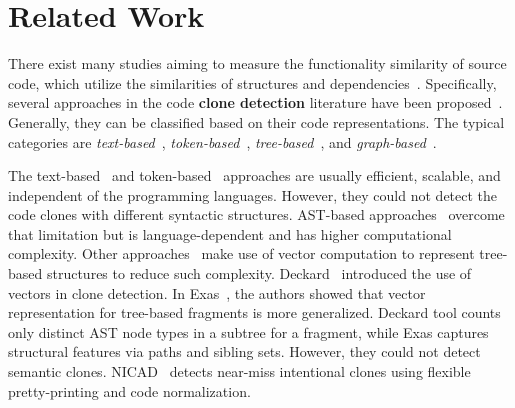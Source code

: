 \section{Related Work}

There exist many studies aiming to measure the functionality
similarity of source code, which utilize the similarities of
structures and 
dependencies~\cite{clone-tse07,roy09,baker97,ccfinder,cpminer,deckard,deckard2,horwitz01,baxter98}.
Specifically, several approaches in the code {\bf clone detection}
literature have been
proposed~\cite{clone-tse07,clonebib,roy09}. Generally, they can be
classified based on their code representations. The typical categories
are {\em text-based}~\cite{ducasse-icsm99},
{\em token-based}~\cite{baker97,ccfinder,cpminer,mende08},
{\em tree-based}~\cite{baxter98,deckard}, and
{\em graph-based}~\cite{deckard2,horwitz01,liu06}.

The text-based~\cite{ducasse-icsm99} and token-based~\cite{ccfinder}
approaches are usually efficient, scalable, and independent of the
programming languages. However, they could not detect the code clones
with different syntactic structures. AST-based
approaches~\cite{baxter98} overcome that limitation but is
language-dependent and has higher computational complexity. Other
approaches~\cite{fase09,deckard} make use of vector computation to
represent tree-based structures to reduce such complexity.
Deckard~\cite{deckard} introduced the use of vectors in clone
detection. In Exas~\cite{fase09}, the authors showed that vector
representation for tree-based fragments is more generalized. Deckard
tool counts only distinct AST node types in a subtree for a fragment,
while Exas captures structural features via paths and sibling
sets. However, they could not detect semantic clones.
%
NICAD~\cite{nicad08} detects near-miss intentional clones using flexible
pretty-printing and code normalization.

